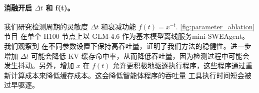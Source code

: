 \paragraph{消融开启 $\Delta t$ 和 f(t)。} 我们研究检测周期的灵敏度 $\Delta t$ 和衰减功能 $f(t) = x^{-t}$. \autoref{fig:parameter_ablation}
 节目 \ouralg 在单个 H100 节点上以 GLM-4.6 作为基本模型离线服务mini-SWEAgent。我们观察到 \ouralg 在不同参数设置下保持高吞吐量，证明了我们方法的稳健性。进一步增加 $\Delta t$ 可能会降低 KV 缓存命中率，从而降低吞吐量，因为检测过程中可能会发生抖动。另外，增加 $x$ 在 $f(t)$ 允许更积极地驱逐执行程序，这些程序通过重新计算成本来降低缓存成本。这会降低智能体程序的吞吐量
工具执行时间短会被过早驱逐。%


